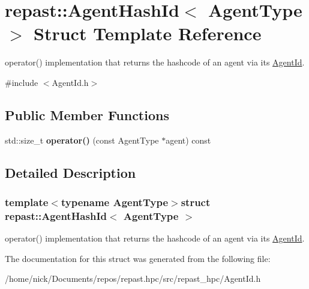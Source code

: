 \hypertarget{structrepast_1_1_agent_hash_id}{\section{repast\-:\-:Agent\-Hash\-Id$<$ Agent\-Type $>$ Struct Template Reference}
\label{structrepast_1_1_agent_hash_id}
}


operator() implementation that returns the hashcode of an agent via its \hyperlink{classrepast_1_1_agent_id}{Agent\-Id}.  




{\ttfamily \#include $<$Agent\-Id.\-h$>$}

\subsection*{Public Member Functions}
\begin{DoxyCompactItemize}
\item 
\hypertarget{structrepast_1_1_agent_hash_id_afff516755fcf498463f6e7817309851b}{std\-::size\-\_\-t {\bfseries operator()} (const Agent\-Type $\ast$agent) const }\label{structrepast_1_1_agent_hash_id_afff516755fcf498463f6e7817309851b}

\end{DoxyCompactItemize}


\subsection{Detailed Description}
\subsubsection*{template$<$typename Agent\-Type$>$struct repast\-::\-Agent\-Hash\-Id$<$ Agent\-Type $>$}

operator() implementation that returns the hashcode of an agent via its \hyperlink{classrepast_1_1_agent_id}{Agent\-Id}. 

The documentation for this struct was generated from the following file\-:\begin{DoxyCompactItemize}
\item 
/home/nick/\-Documents/repos/repast.\-hpc/src/repast\-\_\-hpc/Agent\-Id.\-h\end{DoxyCompactItemize}
